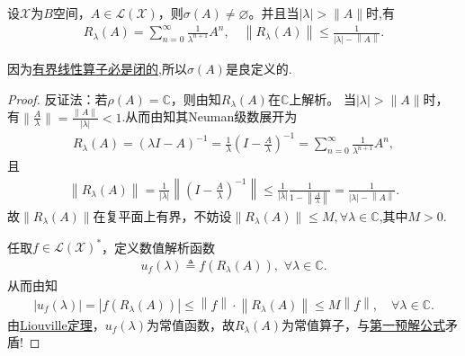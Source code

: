 \documentclass[../../main.tex]{subfiles}%
\begin{document}
\begin{theorem}\label{theorem:谱集非空定理}
设$\mathscr{X}$为$B$空间，$A\in \mathscr{L}(\mathscr{X})$，则$\sigma(A)\neq\varnothing $。并且当$|\lambda|>\|A\|$时,有
\begin{align}\label{eq:resolvent_series}
R_{\lambda}(A)=\sum_{n=0}^{\infty}{\frac{1}{\lambda ^{n+1}}A^n},\quad \left\| R_{\lambda}\left( A \right) \right\|\leqslant \frac{1}{\left| \lambda \right|-\left\| A \right\|}.
\end{align}
\end{theorem}
\begin{remark}
因为\hyperref[proposition:有界线性算子必是闭的]{有界线性算子必是闭的},所以$\sigma(A)$是良定义的.
\end{remark}
\begin{proof}
反证法：若$\rho(A)=\mathbb{C}$，则由知$R_{\lambda}(A)$在$\mathbb{C}$上解析。
当$|\lambda|>\|A\|$时，有$\|\frac{A}{\lambda}\|=\frac{\|A\|}{|\lambda|}<1$.从而由知其Neuman级数展开为
\begin{align*}
R_{\lambda}(A)=\left( \lambda I-A \right) ^{-1}=\frac{1}{\lambda} \left( I-\frac{A}{\lambda} \right) ^{-1}=\sum_{n=0}^{\infty}{\frac{1}{\lambda ^{n+1}}A^n},
\end{align*}
且
\begin{align*}
\left\| R_{\lambda}\left( A \right) \right\| =\frac{1}{\left| \lambda \right|}\left\| \left( I-\frac{A}{\lambda} \right) ^{-1} \right\| \leqslant \frac{1}{\left| \lambda \right|}\frac{1}{1-\left\| \frac{A}{\lambda} \right\|}=\frac{1}{\left| \lambda \right|-\left\| A \right\|}.
\end{align*}
故$\|R_{\lambda}(A)\|$在复平面上有界，不妨设$\|R_{\lambda}(A)\|\leqslant M,\forall \lambda \in \mathbb{C}$,其中$M>0$.

任取$f\in\mathscr{L}(\mathscr{X})^*$，定义数值解析函数
\begin{align*}
u_f(\lambda)\triangleq f(R_{\lambda}(A)),\,\,\forall \lambda \in \mathbb{C}.
\end{align*}
从而由知
\begin{align*}
\left| u_f\left( \lambda \right) \right|=\left| f\left( R_{\lambda}\left( A \right) \right) \right|\leqslant \left\| f \right\| \cdot \left\| R_{\lambda}\left( A \right) \right\| \leqslant M\left\| f \right\| ,\quad \forall \lambda \in \mathbb{C} .
\end{align*}
由\hyperref[Complex Analysis-theorem:Liouville(刘维尔)定理]{Liouville定理}，$u_f(\lambda)$为常值函数，故$R_{\lambda}(A)$为常值算子，与\hyperref[lemma:第一预解公式]{第一预解公式}矛盾!
\end{proof}
\end{document}

